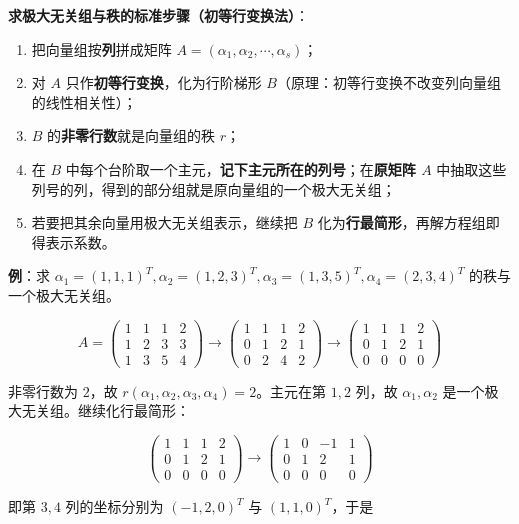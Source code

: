 \documentclass[11pt,openany,UTF8]{ctexbook}
\begin{document}
\textbf{求极大无关组与秩的标准步骤（初等行变换法）}：

\begin{enumerate}
\item 把向量组按\textbf{列}拼成矩阵 $A=(\alpha_1,\alpha_2,\cdots,\alpha_s)$；
\item 对 $A$ 只作\textbf{初等行变换}，化为行阶梯形 $B$（原理：初等行变换不改变列向量组的线性相关性）；
\item $B$ 的\textbf{非零行数}就是向量组的秩 $r$；
\item 在 $B$ 中每个台阶取一个主元，\textbf{记下主元所在的列号}；在\textbf{原矩阵 $A$} 中抽取这些列号的列，得到的部分组就是原向量组的一个极大无关组；
\item 若要把其余向量用极大无关组表示，继续把 $B$ 化为\textbf{行最简形}，再解方程组即得表示系数。
\end{enumerate}
\textbf{例}：求 $\alpha_1=(1,1,1)^T,\alpha_2=(1,2,3)^T,\alpha_3=(1,3,5)^T,\alpha_4=(2,3,4)^T$ 的秩与一个极大无关组。

\[A=\begin{pmatrix} 1 & 1 & 1 & 2 \\ 1 & 2 & 3 & 3 \\ 1 & 3 & 5 & 4 \end{pmatrix}
\to\begin{pmatrix} 1 & 1 & 1 & 2 \\ 0 & 1 & 2 & 1 \\ 0 & 2 & 4 & 2 \end{pmatrix}
\to\begin{pmatrix} 1 & 1 & 1 & 2 \\ 0 & 1 & 2 & 1 \\ 0 & 0 & 0 & 0 \end{pmatrix}\]

非零行数为 $2$，故 $r(\alpha_1,\alpha_2,\alpha_3,\alpha_4)=2$。主元在第 $1,2$ 列，故 $\alpha_1,\alpha_2$ 是一个极大无关组。继续化行最简形：

\[\begin{pmatrix} 1 & 1 & 1 & 2 \\ 0 & 1 & 2 & 1 \\ 0 & 0 & 0 & 0 \end{pmatrix}
\to\begin{pmatrix} 1 & 0 & -1 & 1 \\ 0 & 1 & 2 & 1 \\ 0 & 0 & 0 & 0 \end{pmatrix}\]

即第 $3,4$ 列的坐标分别为 $(-1,2,0)^T$ 与 $(1,1,0)^T$，于是
\end{document}
